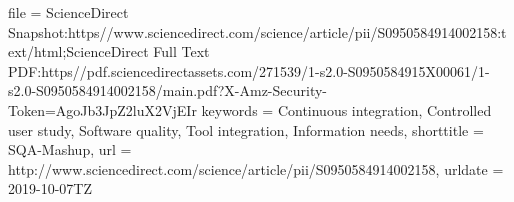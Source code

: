 {{  file       = {ScienceDirect Snapshot:https\://www.sciencedirect.com/science/article/pii/S0950584914002158:text/html;ScienceDirect Full Text PDF:https\://pdf.sciencedirectassets.com/271539/1-s2.0-S0950584915X00061/1-s2.0-S0950584914002158/main.pdf?X-Amz-Security-Token=AgoJb3JpZ2luX2VjEIr%
  keywords   = {Continuous integration, Controlled user study, Software quality, Tool integration, Information needs},
  shorttitle = {{SQA}-{Mashup}},
  url        = {http://www.sciencedirect.com/science/article/pii/S0950584914002158},
  urldate    = {2019-10-07TZ}
}

}}
